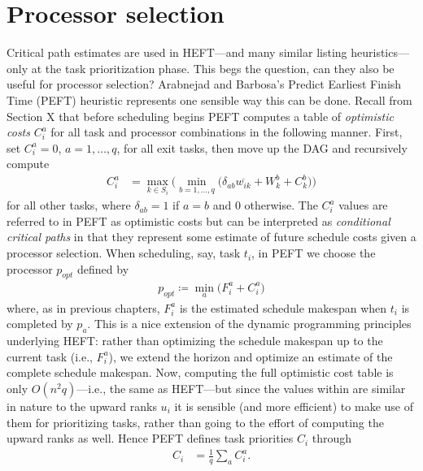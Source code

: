 \documentclass[12pt]{article}
\begin{document}
\section{Processor selection}
\label{sect.processor_selection}

Critical path estimates are used in HEFT---and many similar listing heuristics---only at the task prioritization phase. This begs the question, can they also be useful for processor selection? Arabnejad and Barbosa's Predict Earliest Finish Time (PEFT) heuristic \cite{arabnejad14} represents one sensible way this can be done. Recall from Section X that before scheduling begins PEFT computes a table of {\em optimistic costs} $C_i^a$ for all task and processor combinations in the following manner. First, set $C_i^a = 0$, $a = 1, \dots, q$, for all exit tasks, then move up the DAG and recursively compute 
\begin{align}
C_i^a &= \max_{k \in S_i} \bigg( \min_{b = 1, \dots, q} \big( \delta_{ab}\overline{w_{ik}} + W_k^b + C_k^b \big) \bigg) \label{eq.peft_lookahead}
\end{align} 
for all other tasks, where $\delta_{ab} = 1$ if $a = b$ and $0$ otherwise. The $C_i^a$ values are referred to in PEFT as optimistic costs but can be interpreted as {\em conditional critical paths} in that they represent some estimate of future schedule costs given a processor selection. When scheduling, say, task $t_i$, in PEFT we choose the processor $p_{opt}$ defined by
\begin{align*}
p_{opt} \coloneqq \min_{a} \big( F_i^a + C_i^a \big)
\end{align*}        
where, as in previous chapters, $F_i^a$ is the estimated schedule makespan when $t_i$ is completed by $p_a$. This is a nice extension of the dynamic programming principles underlying HEFT: rather than optimizing the schedule makespan up to the current task (i.e., $F_i^a$), we extend the horizon and optimize an estimate of the complete schedule makespan. Now, computing the full optimistic cost table is only $O(n^2q)$---i.e., the same as HEFT---but since the values within are similar in nature to the upward ranks $u_i$ it is sensible (and more efficient) to make use of them for prioritizing tasks, rather than going to the effort of computing the upward ranks as well. Hence PEFT defines task priorities $C_i$ through
\begin{align}
C_i &= \frac{1}{q} \sum_{a} C_i^a. \label{eq.peft_ranks}
\end{align} 
\end{document}
